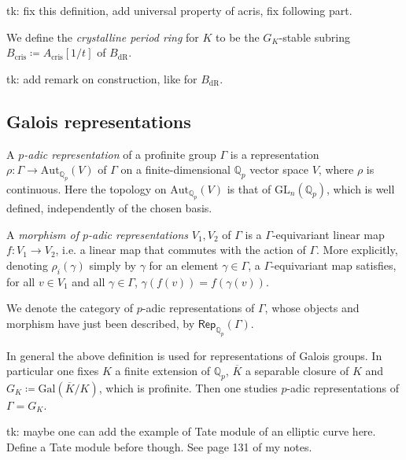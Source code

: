 tk: fix this definition, add universal property of acris, fix following part.
\begin{defn}[]
	We define the {\em crystalline period ring} for $K$
	to be the $G_K$-stable subring $B_{\mathrm{cris}} \coloneqq A_{\mathrm{cris}}[1/t]$
	of $B_{\mathrm{dR}}$.
\end{defn}


\begin{rem}[]
	tk: add remark on construction, like for $B_{\mathrm{dR}}$. 
\end{rem}



\subsection{Galois representations}
\begin{defn}
	A {\em $p$-adic representation} of a profinite group $\Gamma$ is a
	representation $\rho\colon \Gamma \to \mathrm{Aut}_{\mathbb{Q}_p}(V)$
	of $\Gamma$ on a finite-dimensional $\mathbb{Q}_p$ vector space
	$V$, where $\rho$ is continuous.
	Here the topology on $\mathrm{Aut}_{\mathbb{Q}_p}(V)$ is
	that of $\mathrm{GL}_n(\mathbb{Q}_p)$, which is well defined,
	independently of the chosen basis.

	A {\em morphism of $p$-adic representations} $V_1, V_2$ of $\Gamma$
	is a $\Gamma$-equivariant linear map $f\colon V_1 \to V_2$, 
	i.e. a linear map that commutes with the action of $\Gamma$.
	More explicitly, denoting $\rho_i(\gamma)$ simply by $\gamma$ for
	an element $\gamma \in \Gamma$, a $\Gamma$-equivariant
	map satisfies, for all $v \in V_1$ and all $\gamma \in \Gamma$,
	$\gamma(f(v)) = f(\gamma(v))$.

	We denote the category of $p$-adic representations of $\Gamma$,
	whose objects and morphism have just been described,
	by $\mathsf{Rep}_{\mathbb{Q}_p}(\Gamma)$.
\end{defn}


\begin{rem}[]
	In general the above definition is used for representations of Galois groups.
	In particular one fixes $K$ a finite extension of $\mathbb{Q}_p$, $\overline{K}$
	a separable closure of $K$ and $G_K \coloneqq \mathrm{Gal}\left( \overline{K} / K \right)$,
	which is profinite.
	Then one studies $p$-adic representations of $\Gamma = G_K$.
\end{rem}


\begin{rem}[]
	tk: maybe one can add the example of Tate module of an elliptic curve here.
	Define a Tate module before though.
	See page 131 of my notes.
\end{rem}


